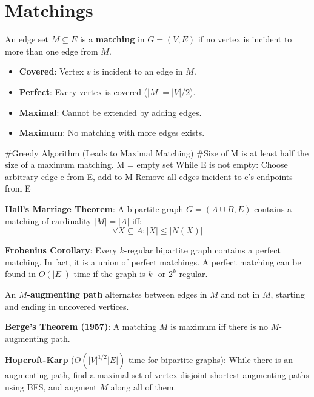 \section{Matchings}

\begin{definition}
	An edge set $M \subseteq E$ is a \textbf{matching} in $G = (V, E)$ if no vertex is incident to more than one edge from $M$.
	\begin{itemize}
		\item \textbf{Covered}: Vertex $v$ is incident to an edge in $M$.
		\item \textbf{Perfect}: Every vertex is covered ($|M| = |V|/2$).
		\item \textbf{Maximal}: Cannot be extended by adding edges.
		\item \textbf{Maximum}: No matching with more edges exists.
	\end{itemize}
\end{definition}

\begin{algorithm}
	#Greedy Algorithm (Leads to Maximal Matching)
	#Size of M is at least half the size of a maximum matching.
	M = empty set
	While E is not empty:
	Choose arbitrary edge e from E, add to M
	Remove all edges incident to e's endpoints from E
\end{algorithm}

\begin{theorem}
	\textbf{Hall's Marriage Theorem}: A bipartite graph $G = (A \cup B, E)$ contains a matching of cardinality $|M|=|A|$ iff:
	$$\forall X \subseteq A : |X| \le |N(X)|$$
\end{theorem}

\begin{theorem}
	\textbf{Frobenius Corollary}: Every $k$-regular bipartite graph contains a perfect matching. In fact, it is a union of perfect matchings. A perfect matching can be found in $O(|E|)$ time if the graph is $k$- or $2^k$-regular.
\end{theorem}

\begin{definition}
	An \textbf{$M$-augmenting path} alternates between edges in $M$ and not in $M$, starting and ending in uncovered vertices.
\end{definition}

\begin{theorem}
	\textbf{Berge's Theorem (1957)}: A matching $M$ is maximum iff there is no $M$-augmenting path.
\end{theorem}

\begin{algorithm}
	\textbf{Hopcroft-Karp} ($O(|V|^{1/2}|E|)$ time for bipartite graphs): While there is an augmenting path, find a maximal set of vertex-disjoint shortest augmenting paths using BFS, and augment $M$ along all of them.
\end{algorithm}
